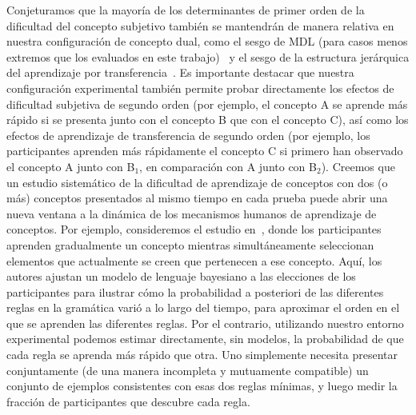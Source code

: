 Conjeturamos que la mayoría de los determinantes de primer orden de la dificultad del concepto subjetivo también se mantendrán de manera relativa en nuestra configuración de concepto dual, como el sesgo de MDL (para casos menos extremos que los evaluados en este trabajo)~\cite{feldman2003simplicity} y el sesgo de la estructura jerárquica del aprendizaje por transferencia~\cite{tano2020towards}. Es importante destacar que nuestra configuración experimental también permite probar directamente los efectos de dificultad subjetiva de segundo orden (por ejemplo, el concepto A se aprende más rápido si se presenta junto con el concepto B que con el concepto C), así como los efectos de aprendizaje de transferencia de segundo orden (por ejemplo, los participantes aprenden más rápidamente el concepto C si primero han observado el concepto A junto con B$_1 $, en comparación con A junto con B$_2$). Creemos que un estudio sistemático de la dificultad de aprendizaje de conceptos con dos (o más) conceptos presentados al mismo tiempo en cada prueba puede abrir una nueva ventana a la dinámica de los mecanismos humanos de aprendizaje de conceptos. Por ejemplo, consideremos el estudio en~\cite{piantadosi2016logical}, donde los participantes aprenden gradualmente un concepto mientras simultáneamente seleccionan elementos que actualmente se creen que pertenecen a ese concepto. Aquí, los autores ajustan un modelo de lenguaje bayesiano a las elecciones de los participantes para ilustrar cómo la probabilidad a posteriori de las diferentes reglas en la gramática varió a lo largo del tiempo, para aproximar el orden en el que se aprenden las diferentes reglas. Por el contrario, utilizando nuestro entorno experimental podemos estimar directamente, sin modelos, la probabilidad de que cada regla se aprenda más rápido que otra. Uno simplemente necesita presentar conjuntamente (de una manera incompleta y mutuamente compatible) un conjunto de ejemplos consistentes con esas dos reglas mínimas, y luego medir la fracción de participantes que descubre cada regla.


